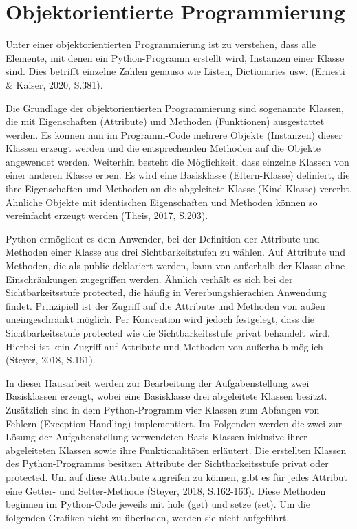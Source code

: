 \documentclass[
    a4paper, 								%
    oneside, 								%
    11pt, 									%
    listof=totoc, 					%
    bibliography=totoc, 		%
    final, 									%
    numbers=noenddot
]{scrreprt}
\begin{document}
\section{Objektorientierte Programmierung}
\label{sec:OOP}
Unter einer objektorientierten Programmierung ist zu verstehen, dass alle Elemente, mit denen ein Python-Programm erstellt wird, Instanzen einer Klasse sind. Dies betrifft einzelne Zahlen genauso wie Listen, Dictionaries usw. (Ernesti \& Kaiser, 2020, S.381). 

Die Grundlage der objektorientierten Programmierung sind sogenannte Klassen, die mit Eigenschaften (Attribute) und Methoden (Funktionen) ausgestattet werden. Es können nun im Programm-Code mehrere Objekte (Instanzen) dieser Klassen erzeugt werden und die entsprechenden Methoden auf die Objekte angewendet werden. Weiterhin besteht die Möglichkeit, dass einzelne Klassen von einer anderen Klasse erben. Es wird eine Basisklasse (Eltern-Klasse) definiert, die ihre Eigenschaften und Methoden an die abgeleitete Klasse (Kind-Klasse) vererbt. Ähnliche Objekte mit identischen Eigenschaften und Methoden können so vereinfacht erzeugt werden (Theis, 2017, S.203).

Python ermöglicht es dem Anwender, bei der Definition der Attribute und Methoden einer Klasse aus drei Sichtbarkeitstufen zu wählen. Auf Attribute und Methoden, die als public deklariert werden, kann von außerhalb der Klasse ohne Einschränkungen zugegriffen werden. Ähnlich verhält es sich bei der Sichtbarkeitsstufe protected, die häufig in Vererbungshierachien Anwendung findet. Prinzipiell ist der Zugriff auf die Attribute und Methoden von außen uneingeschränkt möglich. Per Konvention wird jedoch festgelegt, dass die Sichtbarkeitsstufe protected wie die Sichtbarkeitsstufe privat behandelt wird. Hierbei ist kein Zugriff auf Attribute und Methoden von außerhalb möglich (Steyer, 2018, S.161).

In dieser Hausarbeit werden zur Bearbeitung der Aufgabenstellung zwei Basisklassen erzeugt, wobei eine Basisklasse drei abgeleitete Klassen besitzt. Zusätzlich sind in dem Python-Programm vier Klassen zum Abfangen von Fehlern (Exception-Handling) implementiert. Im Folgenden werden die zwei zur Lösung der Aufgabenstellung verwendeten Basis-Klassen inklusive ihrer abgeleiteten Klassen sowie ihre Funktionalitäten erläutert. 
Die erstellten Klassen des Python-Programms besitzen Attribute der Sichtbarkeitsstufe privat oder protected. Um auf diese Attribute zugreifen zu können, gibt es für jedes Attribut eine Getter- und Setter-Methode (Steyer, 2018, S.162-163). Diese Methoden beginnen im Python-Code jeweils mit hole (get) und setze (set). Um die folgenden Grafiken nicht zu überladen, werden sie nicht aufgeführt.  
\end{document}
